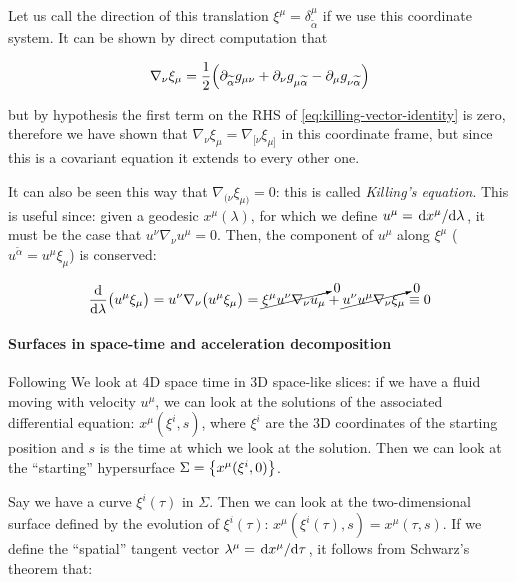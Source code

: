 \documentclass[main.tex]{subfiles}
\begin{document}
Let us call the direction of this translation \(\xi^\mu = \delta^\mu_{\widetilde{\alpha}}\) if we use this coordinate system. It can be shown by direct computation that

\begin{equation} \label{eq:killing-vector-identity}
    \nabla_{\nu} \xi_\mu = \frac{1}{2} \qty(\partial_{\widetilde{\alpha}}
    g_{\mu\nu} + \partial_\nu g_{\mu\widetilde{\alpha}} -
    \partial_\mu g_{\nu \widetilde{\alpha}})
\end{equation}

but by hypothesis the first term on the RHS of \eqref{eq:killing-vector-identity} is zero, therefore we have shown that \(\nabla_{\nu} \xi_\mu = \nabla_{[\nu} \xi_{\mu]}\) in this coordinate frame, but since this is a covariant equation it extends to every other one.

It can also be seen this way that \(\nabla_{(\nu} \xi_{\mu)}=0\): this is called \emph{Killing's equation}. This is useful since: given a geodesic \(x^\mu(\lambda)\), for which we define \(u^\mu = \dv*{x^\mu}{\lambda} \), it must be the case that \(u^\nu \nabla_\nu u^\mu = 0 \). Then, the component of \(u^\mu\) along \(\xi^\mu\) (\(u^{\widetilde{\alpha}} = u^\mu \xi_\mu\)) is conserved:

\begin{equation}
    \dv{}{\lambda} \qty(u^\mu \xi_\mu) = u^\nu \nabla_\nu \qty(u^\mu \xi_\mu)
    = \cancelto{0}{\xi^\mu u^\nu \nabla_\nu u_\mu} + \cancelto{0}{u^\nu u^\mu \nabla_\nu \xi_\mu} \equiv 0
\end{equation}

\paragraph{Surfaces in space-time and acceleration decomposition}

Following \cite[section 4]{Taub:1978}
We look at 4D space time in 3D space-like slices: if we have a fluid moving with velocity \(u^\mu\), we can look at the solutions of the associated differential equation: \(x^\mu (\xi^i, s)\), where \(\xi^i\) are the 3D coordinates of the starting position and \(s\) is the time at which we look at the solution. Then we can look at the ``starting'' hypersurface \(\Sigma = \qty{x^\mu (\xi^i, 0)}\).

Say we have a curve \(\xi^i(\tau)\) in \(\Sigma\). Then we can look at the two-dimensional surface defined by the evolution of \(\xi^i(\tau)\): \(x^{\mu} (\xi^i(\tau), s) = x^\mu (\tau, s)\). If we define the ``spatial'' tangent vector \(\lambda^\mu = \dv*{x^\mu}{\tau} \), it follows from Schwarz's theorem that:
\end{document}
